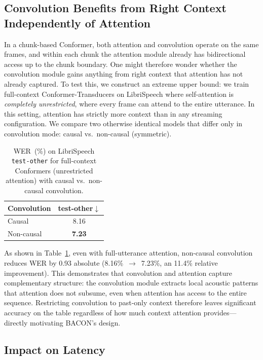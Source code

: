 \documentclass[cameraready]{Interspeech}
\begin{document}
\subsection{Convolution Benefits from Right Context Independently of Attention}
\label{subsec:analysis-fullctx}

In a chunk-based Conformer, both attention and convolution operate on the same
frames, and within each chunk the attention module already has bidirectional
access up to the chunk boundary. One might therefore wonder whether the convolution module gains
anything from right context that attention has not already captured.
To test this, we construct an extreme upper bound: we train
full-context Conformer-Transducers on LibriSpeech where self-attention is
\emph{completely unrestricted}, where every frame can attend to the entire utterance.
In this setting, attention has strictly more context than in any streaming
configuration. We compare two otherwise identical models that differ only in
convolution mode: causal vs.\ non-causal (symmetric).

\begin{table}[h]
\centering
\caption{WER~(\%) on LibriSpeech \texttt{test-other} for full-context
Conformers (unrestricted attention) with causal vs.\ non-causal convolution.}
\label{tab:analysis-fullctx}
\begin{tabular}{lc}
\toprule
\textbf{Convolution} & \textbf{test-other}$\downarrow$ \\
\midrule
Causal      & 8.16 \\
Non-causal  & \textbf{7.23} \\
\bottomrule
\end{tabular}
\end{table}

As shown in Table~\ref{tab:analysis-fullctx}, even with full-utterance attention, non-causal convolution reduces WER by 0.93
absolute (8.16\%~$\rightarrow$~7.23\%, an 11.4\% relative improvement). This
demonstrates that convolution and attention capture complementary structure:
the convolution module extracts local acoustic patterns that attention does not
subsume, even when attention has access to the entire sequence. Restricting
convolution to past-only context therefore leaves significant accuracy on the
table regardless of how much context attention provides---directly motivating
BACON's design.

\subsection{Impact on Latency}
\end{document}
